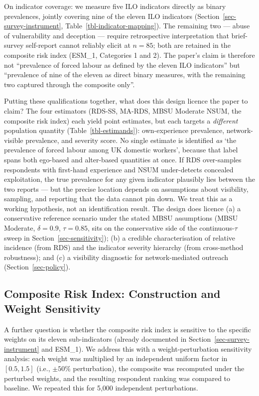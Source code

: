 \documentclass[
  12pt,
  letterpaper,
  DIV=11,
  numbers=noendperiod]{scrartcl}
\begin{document}
On indicator coverage: we measure five ILO indicators directly as binary
prevalences, jointly covering nine of the eleven ILO indicators
(Section~\ref{sec-survey-instrument},
Table~\ref{tbl-indicator-mapping}). The remaining two --- abuse of
vulnerability and deception --- require retrospective interpretation
that brief-survey self-report cannot reliably elicit at \(n = 85\); both
are retained in the composite risk index (ESM\_1, Categories 1 and 2).
The paper's claim is therefore not ``prevalence of forced labour as
defined by the eleven ILO indicators'' but ``prevalence of nine of the
eleven as direct binary measures, with the remaining two captured
through the composite only''.

Putting these qualifications together, what does this design licence the
paper to claim? The four estimators (RDS-SS, MA-RDS, MBSU Moderate NSUM,
the composite risk index) each yield point estimates, but each targets a
\emph{different} population quantity (Table~\ref{tbl-estimands}):
own-experience prevalence, network-visible prevalence, and severity
score. No single estimate is identified \emph{as} `the prevalence of
forced labour among UK domestic workers', because that label spans both
ego-based and alter-based quantities at once. If RDS over-samples
respondents with first-hand experience and NSUM under-detects concealed
exploitation, the true prevalence for any given indicator plausibly lies
between the two reports --- but the precise location depends on
assumptions about visibility, sampling, and reporting that the data
cannot pin down. We treat this as a working hypothesis, not an
identification result. The design does licence (a) a conservative
reference scenario under the stated MBSU assumptions (MBSU Moderate,
\(\delta = 0.9\), \(\tau = 0.85\), sits on the conservative side of the
continuous-\(\tau\) sweep in Section~\ref{sec-sensitivity}); (b) a
credible characterisation of relative incidence (from RDS) and the
indicator severity hierarchy (from cross-method robustness); and (c) a
visibility diagnostic for network-mediated outreach
(Section~\ref{sec-policy}).

\subsection{Composite Risk Index: Construction and Weight
Sensitivity}\label{sec-weights-sensitivity}

A further question is whether the composite risk index is sensitive to
the specific weights on its eleven sub-indicators (already documented in
Section~\ref{sec-survey-instrument} and ESM\_1). We address this with a
weight-perturbation sensitivity analysis: each weight was multiplied by
an independent uniform factor in \([0.5, 1.5]\) (i.e., \(\pm 50\%\)
perturbation), the composite was recomputed under the perturbed weights,
and the resulting respondent ranking was compared to baseline. We
repeated this for 5,000 independent perturbations.
\end{document}
